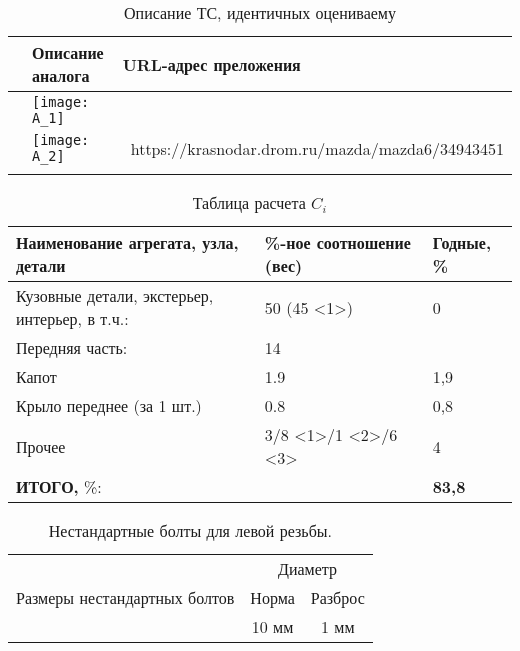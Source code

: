 \begin{longtable}{|p{5mm}|p{85mm}|p{60mm}|}
	\caption[]{\footnotesize {Описание ТС, идентичных оцениваему}} \label{tab:5}\\ 
	\hline
	\rowcolor[HTML]{C0C0C0} 
	\bf	\text{n/n} &\bf  Описание аналога & \bf URL-адрес преложения  \\ \hline \endhead
	\toprule \centering
	\Rownum  &\texttt{[image: A\_1]} &\noindent {\scriptsize\ https://krasnodar.drom.ru/mazda/mazda6/34943451} \\ \hline 	\centering
	\Rownum  &\texttt{[image: A\_2]} & {\noindent \centering  \scriptsize\ https://krasnodar.drom.ru/mazda/mazda6/34943451} \\ \hline 	\centering
	
\end{longtable}


\begin{longtable}{|p{9cm}|p{4cm}|p{2cm}|}
	\caption[]{\footnotesize {Таблица расчета $ C_i $ }}
	\label{tab:7}\\
	\hline
	Наименование агрегата, узла, детали & \%-ное соотношение (вес)  & Годные, \% \\
	\hline \endhead
	Кузовные детали, экстерьер, интерьер, в т.ч.: & 50 (45 \textless{}1\textgreater{}) & 0 \\
	Передняя часть: & 14 &  \\
	Капот & 1.9 & 1,9 \\
	Крыло переднее (за 1 шт.) & 0.8 & 0,8 \\

	Прочее & 3/8 \textless{}1\textgreater{}/1 \textless{}2\textgreater /6 \textless{}3\textgreater{} & 4 \\
	\hline
	\textbf{ИТОГО,} \%: &  & \textbf{83,8}  \\
	\hline	
\end{longtable}
\begin{table}[H]
	\caption{\label{tab:bolts} Нестандартные болты для левой резьбы.}
	\begin{center}
		\begin{tabular}{|c|c|c|}
			\hline
			\multirow{3}{*}{Размеры нестандартных болтов} & \multicolumn{2}{c|}{Диаметр} \\
			\cline{2-3}
			& Норма & Разброс \\
			\cline{2-3}
			& 10 мм & 1 мм \\
			\hline
		\end{tabular}
	\end{center}
\end{table}

